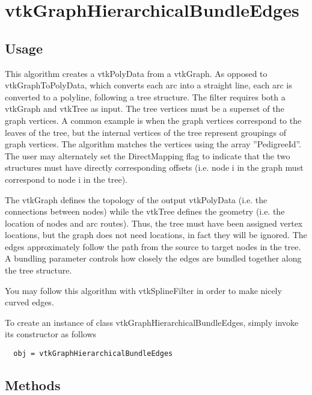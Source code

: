 \section{vtkGraphHierarchicalBundleEdges}

\subsection{Usage}

 This algorithm creates a vtkPolyData from a vtkGraph.  As opposed to
 vtkGraphToPolyData, which converts each arc into a straight line, each arc
 is converted to a polyline, following a tree structure.  The filter requires
 both a vtkGraph and vtkTree as input.  The tree vertices must be a
 superset of the graph vertices.  A common example is when the graph vertices
 correspond to the leaves of the tree, but the internal vertices of the tree
 represent groupings of graph vertices.  The algorithm matches the vertices
 using the array ''PedigreeId''.  The user may alternately set the
 DirectMapping flag to indicate that the two structures must have directly
 corresponding offsets (i.e. node i in the graph must correspond to node i in
 the tree).

 The vtkGraph defines the topology of the output vtkPolyData (i.e.
 the connections between nodes) while the vtkTree defines the geometry (i.e.
 the location of nodes and arc routes).  Thus, the tree must have been
 assigned vertex locations, but the graph does not need locations, in fact
 they will be ignored.  The edges approximately follow the path from the
 source to target nodes in the tree.  A bundling parameter controls how
 closely the edges are bundled together along the tree structure.
 
 You may follow this algorithm with vtkSplineFilter in order to make nicely
 curved edges.

To create an instance of class vtkGraphHierarchicalBundleEdges, simply
invoke its constructor as follows
\begin{verbatim}
  obj = vtkGraphHierarchicalBundleEdges
\end{verbatim}
\subsection{Methods}

